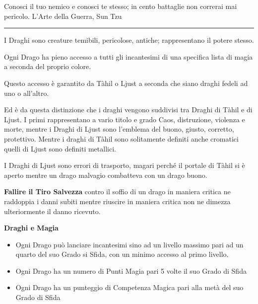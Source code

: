 \begin{multicols}{2}
{\medskip


\begin{enfasi}
Conosci il tuo nemico e conosci te stesso; in cento battaglie non correrai mai pericolo. L'Arte della Guerra, Sun Tzu
\end{enfasi}

\rule{\linewidth}{2pt}

\medskip




I Draghi sono creature temibili, pericolose, antiche; rappresentano il potere stesso.

Ogni Drago ha pieno accesso a tutti gli incantesimi di una specifica lista di magia a seconda del proprio colore.

Questo accesso è garantito da Tàhil o Ljust a seconda che siano draghi fedeli ad uno o all'altro.

Ed è da questa distinzione che i draghi vengono suddivisi tra Draghi di Tàhil e di Ljust. I primi rappresentano a vario titolo e grado Caos, distruzione, violenza e morte, mentre i Draghi di Ljust sono l'emblema del buono, giusto, corretto, protettivo. Mentre i draghi di Tàhil sono solitamente definiti anche cromatici quelli di Ljust sono definiti metallici.

I Draghi di Ljust sono errori di trasporto, magari perché il portale di Tàhil si è aperto mentre un drago malvagio combatteva con un drago buono.

\textbf{Fallire il Tiro Salvezza} contro il soffio di un drago in maniera critica ne raddoppia i danni subiti mentre riuscire in maniera critica non ne dimezza ulteriormente il danno ricevuto.

\medskip

\textbf{Draghi e Magia}

\begin{itemize}[leftmargin=*] \setlength{\itemsep}{0pt}
\item Ogni Drago può lanciare incantesimi sino ad un livello massimo pari ad un quarto del suo Grado si Sfida, con un minimo accesso al primo livello.
\item Ogni Drago ha un numero di Punti Magia pari 5 volte il suo Grado di Sfida
\item Ogni Drago ha un punteggio di Competenza Magica pari alla metà del suo Grado di Sfida
\end{itemize}

\medskip

}
\end{multicols}
